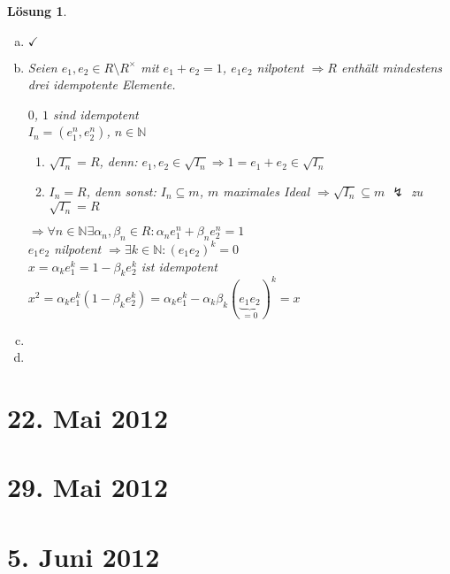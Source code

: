 \documentclass[a4paper, 12pt, numbers=noendperiod, chapterprefix=true]{scrbook}
\theoremstyle{break}
\newtheorem{Loes}{L\"osung}
\theoremstyle{nonumberbreak}
\theoremstyle{nonumberplain}
\newcommand{\N}{\mathbb{N}}
\begin{document}
\begin{Loes}\begin{enumerate}[a)]
\item
	$\checkmark$
\item
	Seien $e_1,e_2 \in R\setminus R^{\times}$ mit $e_1 + e_2 =1$, $e_1e_2$ nilpotent $\Rightarrow R$ enth\"alt mindestens drei idempotente Elemente.
	
	$0$, $1$ sind idempotent\\
	$I_n = (e_1^n, e_2^n)$, $n\in \N$\begin{enumerate}[\textbullet]
	\item
		$\sqrt{I_n} = R$, denn: $e_1, e_2 \in \sqrt{I_n} \Rightarrow 1= e_1 + e_2 \in \sqrt{I_n}$
	\item
		$I_n = R$, denn sonst: $I_n \subseteq m$, $m$ maximales Ideal $\Rightarrow \sqrt{I_n} \subseteq m$ $\lightning$ zu $\sqrt{I_n} = R$
	\end{enumerate}
	$\Rightarrow \forall n \in \N \exists  \alpha_n, \beta_n \in R: \alpha_n e_1^n + \beta_n e_2^n = 1$\\
	$e_1e_2$ nilpotent $\Rightarrow \exists k \in \N: (e_1e_2)^k = 0$\\
	$x = \alpha_ke_1^k = 1 - \beta_ke_2^k$ ist idempotent\\
	$x^2 = \alpha_ke_1^k (1- \beta_ke_2^k) = \alpha_k e_1^k - \alpha_k \beta_k (\underbrace{e_1e_2}_{=0})^k = x$
\item
	
\item
	
\end{enumerate}\end{Loes}

\newpage
\section{22. Mai 2012}
\setcounter{Aufg}{0}
\setcounter{Loes}{0}

\newpage
\section{29. Mai 2012}
\setcounter{Aufg}{0}
\setcounter{Loes}{0}

\newpage
\section{5. Juni 2012}
\setcounter{Aufg}{0}
\setcounter{Loes}{0}
\end{document}
